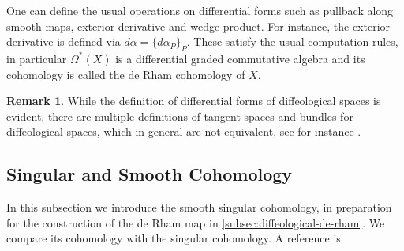 \documentclass{scrartcl}
\theoremstyle{plain}
\theoremstyle{definition}
\newtheorem{remark}[theorem]{Remark}
\begin{document}
One can define the usual operations on differential forms such as pullback along smooth maps, exterior derivative and wedge product. For instance, the exterior derivative is defined via $d\alpha = \{d\alpha_P\}_P$. These satisfy the usual computation rules, in particular $\Omega^*(X)$ is a differential graded commutative algebra and its cohomology is called the de Rham cohomology of $X$. 

\begin{remark}
    While the definition of differential forms of diffeological spaces is evident, there are multiple definitions of tangent spaces and bundles for diffeological spaces, which in general are not equivalent, see for instance \cite{christensen2015tangent}.
\end{remark}



\subsection{Singular and Smooth Cohomology} \label{subsec:diffeology-cohomology}

In this subsection we introduce the smooth singular cohomology, in preparation for the construction of the de Rham map in \cref{subsec:diffeological-de-rham}. We compare its cohomology with the singular cohomology. A reference is \cite{gurer2014topologie}.
\end{document}
